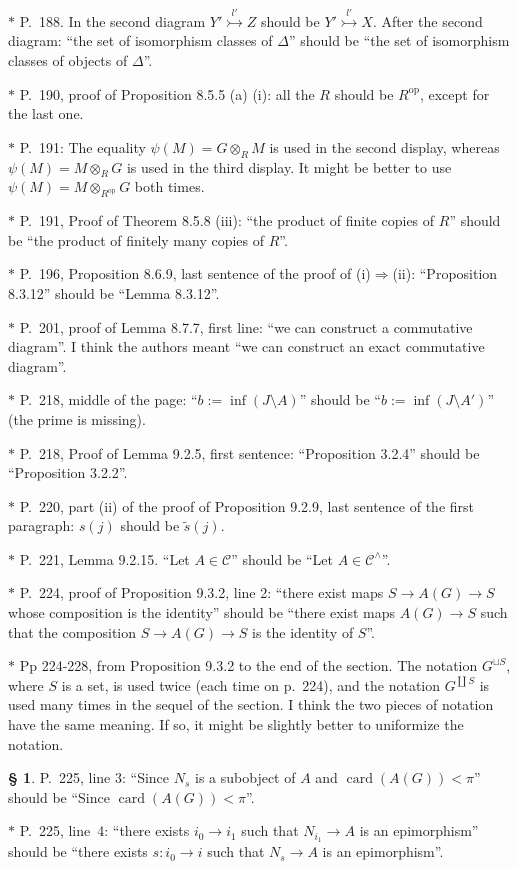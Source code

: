 \documentclass[12pt]{article}
\theoremstyle{remark}
\theoremstyle{definition}
\newtheorem{s}[thm]{\S}
\newcommand{\nn}{\noindent}
\newcommand{\C}{\mathcal C}
\newcommand{\then}{\Rightarrow}
\DeclareMathOperator{\card}{card}
\DeclareMathOperator{\op}{op}
\begin{document}
\nn$*$ P.~188. In the second diagram $Y'\overset{l'}{\rightarrowtail}Z$ should be $Y'\overset{l'}{\rightarrowtail}X$. After the second diagram: ``the set of isomorphism classes of $\Delta$'' should be ``the set of isomorphism classes of objects of $\Delta$''.

\nn$*$ P.~190, proof of Proposition 8.5.5 (a) (i): all the $R$ should be $R^{\op}$, except for the last one.

\nn$*$ P.~191: The equality $\psi(M)=G\otimes_RM$ is used in the second display, whereas $\psi(M)=M\otimes_RG$ is used in the third display. It might be better to use $\psi(M)=M\otimes_{R^{\op}}G$ both times. 

\nn$*$ P.~191, Proof of Theorem 8.5.8 (iii): ``the product of finite copies of $R$'' should be ``the product of finitely many copies of $R$''.

\nn$*$ P.~196, Proposition 8.6.9, last sentence of the proof of (i)$\then$(ii): ``Proposition 8.3.12'' should be ``Lemma 8.3.12''.

\nn$*$ P.~201, proof of Lemma 8.7.7, first line: ``we can construct a commutative diagram''. I think the authors meant ``we can construct an exact commutative diagram''.

\nn$*$ P.~218, middle of the page: ``$b:=\inf(J\setminus A)$'' should be ``$b:=\inf(J\setminus A')$'' (the prime is missing). 

\nn$*$ P.~218, Proof of Lemma 9.2.5, first sentence: ``Proposition 3.2.4'' should be ``Proposition 3.2.2''.

\nn$*$ P.~220, part (ii) of the proof of Proposition 9.2.9, last sentence of the first paragraph: $s(j)$ should be $\tilde s(j)$.

\nn$*$ P.~221, Lemma 9.2.15. ``Let $A\in\C$'' should be ``Let $A\in\C^\wedge$''.

\nn$*$ P.~224, proof of Proposition 9.3.2, line 2: ``there exist maps $S\to A(G)\to S$ whose composition is the identity'' should be ``there exist maps $A(G)\to S$ such that the composition $S\to A(G)\to S$ is the identity of $S$''.

\nn$*$ Pp 224-228, from Proposition 9.3.2 to the end of the section. The notation $G^{\sqcup S}$, where $S$ is a set, is used twice (each time on p.~224), and the notation $G^{\coprod S}$ is used many times in the sequel of the section. I think the two pieces of notation have the same meaning. If so, it might be slightly better to uniformize the notation.

\begin{s}\label{225}
P.~225, line 3: ``Since $N_s$ is a subobject of $A$ and $\card(A(G))<\pi$'' should be ``Since $\card(A(G))<\pi$''.

\nn$*$ P.~225, line~4: ``there exists $i_0\to i_1$ such that $N_{i_1}\to A$ is an epimorphism'' should be ``there exists $s:i_0\to i$ such that $N_s\to A$ is an epimorphism''.
\end{s}
\end{document}
